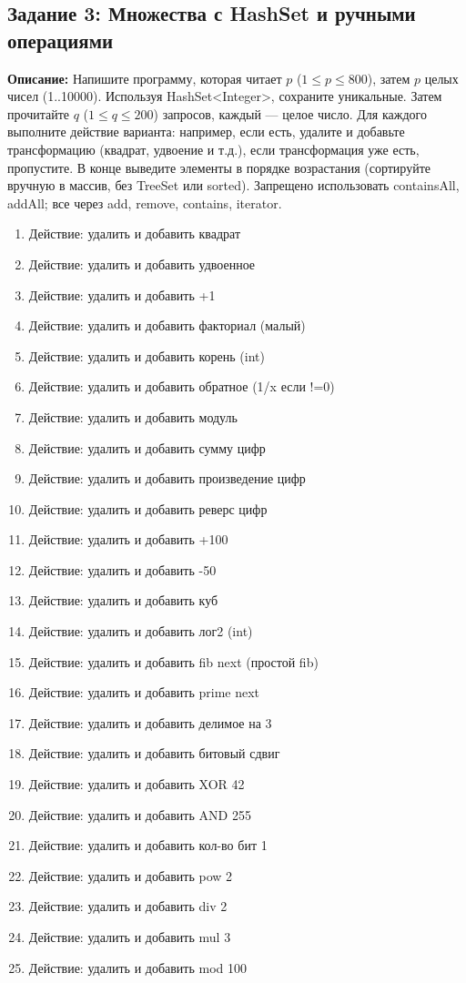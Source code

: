 \documentclass[12pt]{article}
\begin{document}
\subsection{Задание 3: Множества с HashSet и ручными операциями}
  \textbf{Описание:} Напишите программу, которая читает $p$ ($1 \leq p \leq 800$), затем $p$ целых чисел (1..10000). Используя HashSet<Integer>, сохраните уникальные. Затем прочитайте $q$ ($1 \leq q \leq 200$) запросов, каждый — целое число. Для каждого выполните действие варианта: например, если есть, удалите и добавьте трансформацию (квадрат, удвоение и т.д.), если трансформация уже есть, пропустите. В конце выведите элементы в порядке возрастания (сортируйте вручную в массив, без TreeSet или sorted). Запрещено использовать containsAll, addAll; все через add, remove, contains, iterator.

  \begin{enumerate}
    \item Действие: удалить и добавить квадрат
    \item Действие: удалить и добавить удвоенное
    \item Действие: удалить и добавить +1
    \item Действие: удалить и добавить факториал (малый)
    \item Действие: удалить и добавить корень (int)
    \item Действие: удалить и добавить обратное (1/x если !=0)
    \item Действие: удалить и добавить модуль
    \item Действие: удалить и добавить сумму цифр
    \item Действие: удалить и добавить произведение цифр
    \item Действие: удалить и добавить реверс цифр
    \item Действие: удалить и добавить +100
    \item Действие: удалить и добавить -50
    \item Действие: удалить и добавить куб
    \item Действие: удалить и добавить лог2 (int)
    \item Действие: удалить и добавить fib next (простой fib)
    \item Действие: удалить и добавить prime next
    \item Действие: удалить и добавить делимое на 3
    \item Действие: удалить и добавить битовый сдвиг
    \item Действие: удалить и добавить XOR 42
    \item Действие: удалить и добавить AND 255
    \item Действие: удалить и добавить кол-во бит 1
    \item Действие: удалить и добавить pow 2
    \item Действие: удалить и добавить div 2
    \item Действие: удалить и добавить mul 3
    \item Действие: удалить и добавить mod 100
  \end{enumerate}
\end{document}
